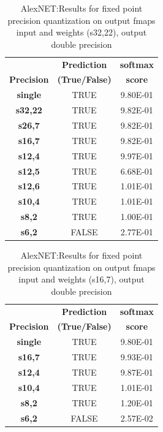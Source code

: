 \documentclass[conference]{IEEEtran}
\begin{document}
\begin{table}[!ht]
\centering
\caption{AlexNET:Results for fixed point precision quantization on output fmaps input and weights (s32,22), output double precision}
\label{res1}
\begin{tabular}{ccc}
\hline
                   & \textbf{Prediction}   & \textbf{softmax}  \\
\textbf{Precision} & \textbf{(True/False)} & \textbf{score}         \\ \hline
\color{red}\textbf{single}    & \color{red}TRUE                  & \color{red}9.80E-01          \\
\textbf{s32,22}    & TRUE                  & 9.82E-01                    \\
\textbf{s26,7}     & TRUE                  & 9.82E-01                    \\
\textbf{s16,7}     & TRUE                  & 9.82E-01                    \\
\textbf{s12,4}     & TRUE                  & 9.97E-01                      \\
\textbf{s12,5}     & TRUE                  & 6.68E-01                     \\
\textbf{s12,6}     & TRUE                  & 1.01E-01                     \\
\textbf{s10,4}     & TRUE                  & 1.01E-01                     \\
\textbf{s8,2}      & TRUE                  & 1.00E-01                     \\
\textbf{s6,2}      & FALSE                 & 2.77E-01                     \\ \hline
\end{tabular}
\end{table}


 


\begin{table}[!ht]
\centering
\caption{AlexNET:Results for fixed point precision quantization on output fmaps input and weights (s16,7), output double precision}
\label{res2}
\begin{tabular}{ccc}
\hline
                   & \textbf{Prediction} & \textbf{softmax}  \\ 
\textbf{Precision} & \textbf{(True/False)}    & \textbf{score}  \\ \hline
\color{red}\textbf{single}    & \color{red}TRUE                  & \color{red}9.80E-01         \\
\textbf{s16,7}     & TRUE                & 9.93E-01                     \\
\textbf{s12,4}     & TRUE                & 9.87E-01                     \\
\textbf{s10,4}     & TRUE                & 1.01E-01                      \\
\textbf{s8,2}      & TRUE                & 1.20E-01                    \\
\textbf{s6,2}      & FALSE               & 2.57E-02                     \\ \hline
\end{tabular}
\end{table}
\end{document}

